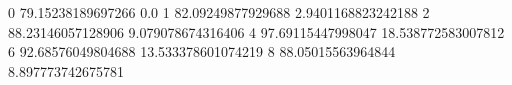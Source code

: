 0 79.15238189697266 0.0
1 82.09249877929688 2.9401168823242188
2 88.23146057128906 9.079078674316406
4 97.69115447998047 18.538772583007812
6 92.68576049804688 13.533378601074219
8 88.05015563964844 8.897773742675781
